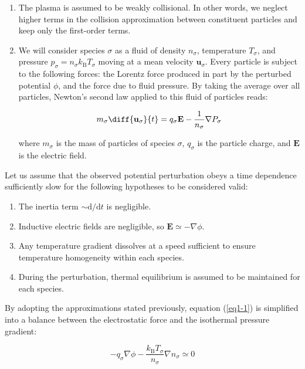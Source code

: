 \begin{enumerate}
    \item The plasma is assumed to be weakly collisional. In other words, we neglect higher terms in the collision approximation between constituent particles and keep only the first-order terms.
    \item We will consider species $\sigma$ as a fluid of density $n_\sigma$, temperature $T_\sigma$, and pressure $p_\sigma=n_\sigma k_\mathrm{B}T_\sigma$ moving at a mean velocity $\mathbf{u}_\sigma$. Every particle is subject to the following forces: the Lorentz force produced in part by the perturbed potential $\phi$, and the force due to fluid pressure. By taking the average over all particles, Newton's second law applied to this fluid of particles reads:
    
    \begin{equation}
        \label{eq1-1}
        m_\sigma\diff{\mathbf{u}_\sigma}{t}=q_\sigma\mathbf{E}-\frac{1}{n_\sigma}\nabla P_\sigma
    \end{equation}
    
    where $m_\sigma$ is the mass of particles of species $\sigma$, $q_\sigma$ is the particle charge, and $\mathbf{E}$ is the electric field.
\end{enumerate}

Let us assume that the observed potential perturbation obeys a time dependence sufficiently slow for the following hypotheses to be considered valid:

\begin{enumerate}
    \item The inertia term $\sim\mathrm{d}/\mathrm{d}t$ is negligible.
    \item Inductive electric fields are negligible, so $\mathbf{E}\simeq-\nabla\phi$.
    \item Any temperature gradient dissolves at a speed sufficient to ensure temperature homogeneity within each species.
    \item During the perturbation, thermal equilibrium is assumed to be maintained for each species.
\end{enumerate}

By adopting the approximations stated previously, equation (\ref{eq1-1}) is simplified into a balance between the electrostatic force and the isothermal pressure gradient:

\begin{equation}
    \label{eq1-2}
    -q_\sigma\nabla\phi-\frac{k_\mathrm{B}T_\sigma}{n_\sigma}\nabla n_\sigma\simeq0
\end{equation}

